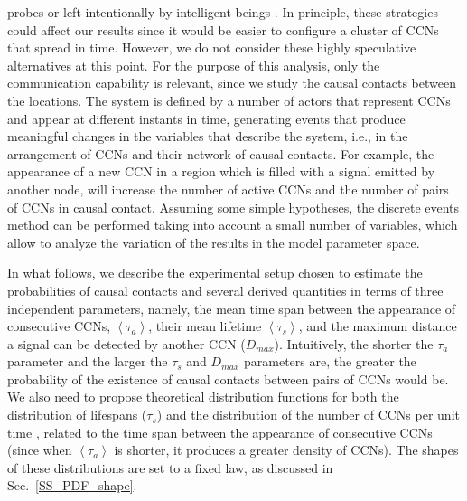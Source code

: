 \documentclass[crop]{CSLB}
\newcommand{\ceti}{CCN}
\newcommand{\cetis}{CCNs}
\begin{document}
probes or left intentionally by intelligent beings \citep[see, e.g.,
][]{peters_outer_2018, barlow_galactic_2013}.
%
In principle, these strategies could affect our results since it would
be easier to configure a cluster of \cetis{} that spread in time.
%
However, we do not consider these highly speculative alternatives at
this point.
%
For the purpose of this analysis, only the communication capability is
relevant, since we study the causal contacts between the locations.
%
The system is defined by a number of actors that represent \cetis{}
and appear at different instants in time, generating events that
produce meaningful changes in the variables that describe the system,
i.e., in the arrangement of \cetis{} and their network of causal
contacts.
%
For example, the appearance of a new \ceti{} in a region which is
filled with a signal emitted by another node, will increase the
number of active \cetis{} and the number of pairs of \cetis{} in
causal contact.
%
Assuming some simple hypotheses, the discrete events method can be
performed taking into account a small number of variables, which allow
to analyze the variation of the results in the model parameter space.


In what follows, we describe the experimental setup chosen to estimate
the probabilities of causal contacts and several derived quantities in
terms of three independent parameters, namely, the mean time span
between the appearance of consecutive \cetis{}, $\left<\tau_a\right>$,
their mean lifetime $\left<\tau_s\right>$, and the maximum distance a
signal can be detected by another \ceti{} ($D_{max}$).
%
Intuitively, the shorter the $\tau_a$ parameter and the larger the
$\tau_s$ and $D_{max}$ parameters are, the greater the probability of
the existence of causal contacts between pairs of \cetis{} would be.
%
We also need to propose theoretical distribution functions for both
the distribution of lifespans ($\tau_s$) and the distribution of the
number of \cetis{} per unit time \citep{maccone_evolution_2014,
Sotos_biotechnology_2019}, related to the time span between the
appearance of consecutive \cetis{} (since when $\left<\tau_a\right>$
is shorter, it produces a greater density of \cetis{}).
%
The shapes of these distributions are set to a fixed law, as discussed
in Sec.~\ref{SS_PDF_shape}.
     
\end{document}
